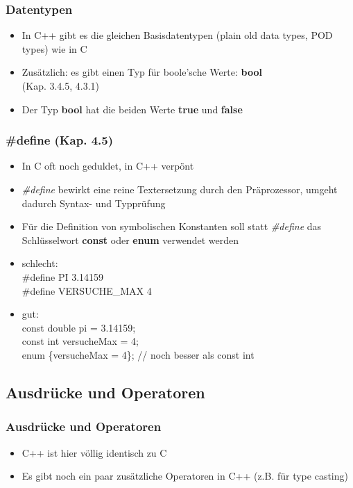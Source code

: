\subsubsection{Datentypen\hfill}
\label{sec::unterunterabschnitt}
\begin{itemize}
	\item In C++ gibt es die gleichen Basisdatentypen (plain old data types, POD types) wie in C
	\item Zusätzlich: es gibt einen Typ für boole'sche Werte: \textbf{bool}
		\\ \small{(Kap. 3.4.5, 4.3.1)}
	\item Der Typ \textbf{bool} hat die beiden Werte \textbf{true} und \textbf{false}
\end{itemize}

\subsubsection{\#define		(Kap. 4.5)\hfill}
\label{sec:unterunterabschnitt}
\begin{itemize}
	\item In C oft noch geduldet, in C++ verpönt
	\item \emph{\#define} bewirkt eine reine Textersetzung durch den Präprozessor, umgeht dadurch Syntax- und Typprüfung
	\item Für die Definition von symbolischen Konstanten soll statt \emph{ \#define} das Schlüsselwort \textbf{const} oder \textbf{enum} verwendet 	werden
 	\color{\ownRed}
	\item schlecht:
	\\
	\#define PI			3.14159
	\\ 
	\#define VERSUCHE\_MAX	4
	\color{\ownBlue}
	\item gut:
	\\const double pi = 3.14159;
	\\const int versucheMax = 4;
	\\enum \{versucheMax = 4\};	// noch besser als const int
\end{itemize}

\subsection{Ausdrücke und Operatoren\hfill}
\label{sec:unterabschnitt}

\subsubsection{Ausdrücke und Operatoren\hfill}
\label{sec:unterunterabschnitt}
\begin{itemize}
	\item C++ ist hier völlig identisch zu C
	\item Es gibt noch ein paar zusätzliche Operatoren in C++ (z.B. für type casting)
\end{itemize}

